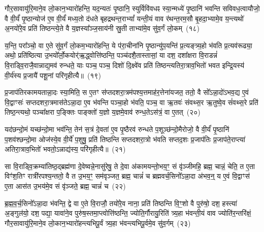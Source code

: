 गौर॒सावायु॑रि॒माने॒व लो॒कान॒भ्यारो॑हन्ति॒ यद॒न्यतः॑ पृ॒ष्ठानि॒ स्युर्विवि॑वधꣴ स्या॒न्मध्ये॑ पृ॒ष्ठानि॑ भवन्ति सविवध॒त्वायौजो॒ वै वी॒र्यं॑ पृ॒ष्ठान्योज॑ ए॒व वी॒र्यं॑ मध्य॒तो द॑धते बृहद्रथन्त॒रा\-भ्यां᳚ यन्ती॒यं वाव र॑थन्त॒रम॒सौ बृ॒हदा॒भ्यामे॒व य॒न्त्यथो॑ अ॒नयो॑रे॒व प्रति॑ तिष्ठन्त्ये॒ते वै य॒ज्ञस्या᳚ञ्ज॒साय॑नी स्रु॒ती ताभ्या॑मे॒व सु॑व॒र्गं लो॒कम्~(१८)\ip

य॒न्ति॒ परा᳚ञ्चो॒ वा ए॒ते सु॑व॒र्गं लो॒कम॒भ्यारो॑हन्ति॒ ये प॑रा॒चीना॑नि पृ॒ष्ठान्यु॑प॒यन्ति॑ प्र॒त्यङ्त्र्य॒हो भ॑वति प्र॒त्यव॑रूढ्या॒ अथो॒ प्रति॑ष्ठित्या उ॒भयो᳚र्लो॒कयोर्॑ऋ॒द्ध्वोत्ति॑ष्ठन्ति॒ पञ्च॑दशै॒तास्तासां॒ या दश॒ दशा᳚क्षरा वि॒राडन्नं॑ वि॒राड्वि॒राजै॒वान्नाद्य॒\-मव॑ रुन्धते॒ याः पञ्च॒ पञ्च॒ दिशो॑ दि॒क्ष्वे॑व प्रति॑ तिष्ठन्त्यतिरा॒त्राव॒भितो॑ भवत इन्द्रि॒यस्य॑ वी॒र्य॑स्य प्र॒जायै॑ पशू॒नां परि॑गृहीत्यै॥~(१९)\ip

{\anuvakamend[{ग॒च्छ॒न्त्य॒ग्नि॒ष्टुता॑ पा॒प्मान॒न्निर॒न्तरि॑क्षं लो॒कं प्र॒जायै॒ द्वे च॑}]}

प्र॒जा\-प॑तिरकामयतान्ना॒दः स्या॒मिति॒ स ए॒तꣳ स॑प्तदशरा॒त्रम॑पश्य॒त्तमाह॑र॒त्तेना॑यजत॒ ततो॒ वै सो᳚\-ऽन्ना॒दो॑\-ऽभव॒द्य ए॒वं वि॒द्वाꣳसः॑ सप्तदशरा॒त्रमास॑ते\-ऽन्ना॒दा ए॒व भ॑वन्ति पञ्चा॒हो भ॑वति॒ पञ्च॒ वा ऋ॒तवः॑ संवथ्स॒र ऋ॒तुष्वे॒व सं॑वथ्स॒रे प्रति॑ तिष्ठ॒न्त्यथो॒ पञ्चा᳚क्षरा प॒ङ्क्तिः पाङ्क्तो॑ य॒ज्ञो य॒ज्ञमे॒वाव॑ रुन्ध॒ते\-ऽस॑त्रं॒ वा ए॒तत्~(२०)\ip

यद॑छन्दो॒मं यच्छ॑न्दो॒मा भव॑न्ति॒ तेन॑ स॒त्रं दे॒वता॑ ए॒व पृ॒ष्ठैरव॑ रुन्धते प॒शूञ्छ॑न्दो॒मैरोजो॒ वै वी॒र्यं॑ पृ॒ष्ठानि॑ प॒शव॑श्छन्दो॒मा ओज॑स्ये॒व वी॒र्ये॑ प॒शुषु॒ प्रति॑ तिष्ठन्ति सप्तदशरा॒त्रो भ॑वति सप्तद॒शः प्र॒जा\-प॑तिः प्र॒जा\-प॑ते॒राप्त्या॑ अतिरा॒त्राव॒भितो॑ भवतो॒\-ऽन्नाद्य॑स्य॒ परि॑गृहीत्यै॥~(२१)\ip

{\anuvakamend[{ए॒तथ्स॒प्तत्रिꣴ॑श्चच्च}]}

सा वि॒राड्वि॒क्रम्या॑तिष्ठ॒द्ब्रह्म॑णा दे॒वेष्वन्ने॒नासु॑रेषु॒ ते दे॒वा अ॑कामयन्तो॒भय॒ꣳ॒ सं वृ॑ञ्जीमहि॒ ब्रह्म॒ चान्नं॒ चेति॒ त ए॒ता विꣳ॑श॒तिꣳ रात्री॑रपश्य॒न्ततो॒ वै त उ॒भय॒ꣳ॒ सम॑वृञ्जत॒ ब्रह्म॒ चान्नं॑ च ब्रह्मवर्च॒सिनो᳚\-ऽन्ना॒दा अ॑भव॒न्॒ य ए॒वं वि॒द्वाꣳस॑ ए॒ता आस॑त उ॒भय॑मे॒व सं वृ॑ञ्जते॒ ब्रह्म॒ चान्नं॑ च~(२२)\ip

ब्र॒ह्म॒व॒र्च॒सिनो᳚\-ऽन्ना॒दा भ॑वन्ति॒ द्वे वा ए॒ते वि॒राजौ॒ तयो॑रे॒व नाना॒ प्रति॑ तिष्ठन्ति वि॒ꣳ॒शो वै पुरु॑षो॒ दश॒ हस्त्या॑ अ॒ङ्गुल॑यो॒ दश॒ पद्या॒ यावा॑ने॒व पुरु॑ष॒स्तमा॒प्त्वोत्ति॑ष्ठन्ति॒ ज्योति॒र्गौरायु॒रिति॑ त्र्य॒हा भ॑वन्ती॒यं वाव ज्योति॑र॒न्तरि॑क्षं॒ गौर॒सावायु॑रि॒माने॒व लो॒कान॒भ्यारो॑हन्त्यभिपू॒र्वं त्र्य॒हा भ॑वन्त्यभिपू॒र्वमे॒व सु॑व॒र्गम्~(२३)\ip

